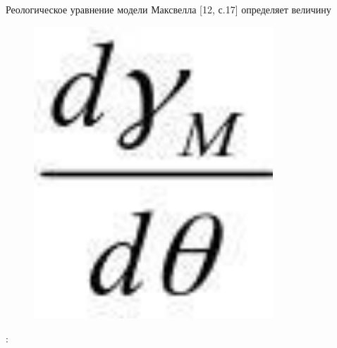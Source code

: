 
Реологическое уравнение модели Максвелла {[}12, с.17{]} определяет
величину \begin{figure}[H]
	\centering
	\includegraphics[width=0.8\textwidth]{assets/319}
	\caption*{}
\end{figure}:


